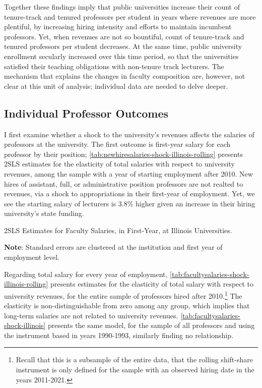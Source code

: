 \documentclass[notitlepage,12pt]{article}
\begin{document}
Together these findings imply that public universities increase their count of tenure-track and tenured professors per student in years where revenues are more plentiful, by increasing hiring intensity and efforts to maintain incumbent professors.
Yet, when revenues are not so bountiful, count of tenure-track and tenured professors per student decreases.
At the same time, public university enrollment secularly increased over this time period, so that the universities satisfied their teaching obligations with non-tenure track lecturers.
The mechanism that explains the changes in faculty composition are, however, not clear at this unit of analysis; individual data are needed to delve deeper.


\subsection{Individual Professor Outcomes}

I first examine whether a shock to the university's revenues affects the salaries of professors at the university.
The first outcome is first-year salary for each professor by their position;
\autoref{tab:newhiresalaries-shock-illinois-rolling} presents 2SLS estimates for the elasticity of total salaries with respect to university revenues, among the sample with a year of starting employment after 2010.
New hires of assistant, full, or administrative position professors are not realted to revenues, via a shock to appropriations in their first-year of employment.
Yet, we see the starting salary of lecturers is 3.8\% higher given an increase in their hiring university's state funding.

\begin{table}[!h]
    \singlespacing
    \centering
    \caption{2SLS Estimates for Faculty Salaries, in First-Year, at Illinois Universities.}
    \makebox[\textwidth][c]{}
    \begin{flushleft}
        \footnotesize
        \textbf{Note}: Standard errors are clustered at the institution and first year of employment level. 
    \end{flushleft}
    \label{tab:newhiresalaries-shock-illinois-rolling}
\end{table}

Regarding total salary for every year of employment, \autoref{tab:facultysalaries-shock-illinois-rolling} presents estimates for the elasticity of total salary with respect to university revenues, for the entire sample of professors hired after 2010.\footnote{Recall that this is a subsample of the entire data, that the rolling shift-share instrument is only defined for the sample with an observed hiring date in the years 2011-2021.}
The elasticity is non-distinguishable from zero among any group, which implies that long-term salaries are not related to university revenues.
\autoref{tab:facultysalaries-shock-illinois} presents the same model, for the sample of all professors and using the instrument based in years 1990-1993, similarly finding no relationship.
\end{document}
